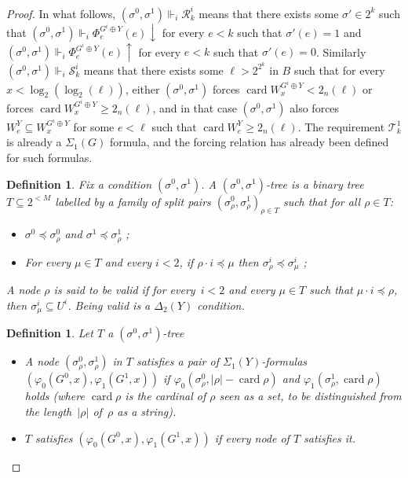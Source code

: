 \documentclass{article}
\def\R{\mathcal{R}}
\def\T{\mathcal{T}}
\def\S{\mathcal{S}}
\newcommand{\card}{\operatorname{card}}
\numberwithin{theorem}{section}
\newtheorem{definition}[theorem]{Definition}
\newcommand{\ludovic}[1]{\textcolor{blue}{#1}}
\begin{document}
\begin{proof}
In what follows, $(\sigma^0, \sigma^1) \Vdash_i \R_k^i$ means that there exists some $\sigma' \in 2^k$ such that $(\sigma^0, \sigma^1) \Vdash_i \Phi_e^{G^i \oplus Y}(e) \downarrow$ for every $e < k$ such that $\sigma'(e) = 1$ and $(\sigma^0, \sigma^1) \Vdash_i \Phi_e^{G^i \oplus Y}(e) \uparrow$ for every $e < k$ such that $\sigma'(e) = 0$. Similarly $(\sigma^0, \sigma^1) \Vdash_i \S_k^i$ means that there exists some $\ell > 2^{2^k}$ in $B$ such that for every $x < \log_2(\log_2(\ell))$, either $(\sigma^0, \sigma^1)$ forces $\card W_x^{G^i \oplus Y} < 2_n(\ell)$ or forces $\card W_x^{G^i \oplus Y} \geq 2_n(\ell)$, and in that case $(\sigma^0, \sigma^1)$ also forces $W_e^Y \subseteq W_x^{G^i \oplus Y}$ for some $e < \ell$ such that $\card W_e^Y \geq 2_n(\ell)$. The requirement $\T^1_k$ is already a $\Sigma_1(G)$ formula, and the forcing relation has already been defined for such formulas.

\begin{definition}
Fix a condition $(\sigma^0, \sigma^1)$.
A \emph{$(\sigma^0, \sigma^1)$-tree} is a binary tree $T \subseteq 2^{<M}$ labelled by a family of split pairs $(\sigma^0_{\rho}, \sigma^1_{\rho})_{\rho \in T}$ such that for all $\rho \in T$: 
\begin{itemize}
    \item $\sigma^0 \preceq \sigma^0_{\rho}$ and $\sigma^1 \preceq \sigma^1_{\rho}$ ;
    \item For every $\mu \in T$ and every $i < 2$, if $\rho \cdot i \preceq \mu$ then $\sigma^i_{\rho} \preceq \sigma^i_{\mu}$ ;
\end{itemize}
     A node $\rho$ is said to be \emph{valid} if for every~$i < 2$ and every $\mu \in T$ such that $\mu \cdot i \preceq \rho$, then $\sigma^i_\mu \subseteq U^i$. %
     Being valid is a $\Delta_2(Y)$ condition.
\end{definition}

\begin{definition}
    Let $T$ a $(\sigma^0,\sigma^1)$-tree 
    \begin{itemize}
        \item A node $(\sigma^0_{\rho}, \sigma^1_{\rho})$ in $T$ \emph{satisfies} a pair of $\Sigma_1(Y)$-formulas $(\varphi_0(G^0, x), \varphi_1(G^1,x))$ if $\varphi_0(\sigma^0_{\rho}, |\rho| - \card \rho)$ and $\varphi_1(\sigma^1_{\rho}, \card \rho)$ holds (where $\card \rho$ is the cardinal of $\rho$ seen as a set, to be distinguished from the length~$|\rho|$ of~$\rho$ as a string). 
        \item $T$ \emph{satisfies} $(\varphi_0(G^0, x), \varphi_1(G^1,x))$ if every node of $T$ satisfies it.
    \end{itemize}
\end{definition}


\end{proof}
\end{document}
